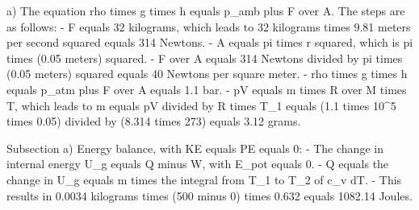 a) The equation rho times g times h equals p_amb plus F over A. The steps are as follows:
- F equals 32 kilograms, which leads to 32 kilograms times 9.81 meters per second squared equals 314 Newtons.
- A equals pi times r squared, which is pi times (0.05 meters) squared.
- F over A equals 314 Newtons divided by pi times (0.05 meters) squared equals 40 Newtons per square meter.
- rho times g times h equals p_atm plus F over A equals 1.1 bar.
- pV equals m times R over M times T, which leads to m equals pV divided by R times T_1 equals (1.1 times 10^5 times 0.05) divided by (8.314 times 273) equals 3.12 grams.

Subsection a) Energy balance, with KE equals PE equals 0:
- The change in internal energy U_g equals Q minus W, with E_pot equals 0.
- Q equals the change in U_g equals m times the integral from T_1 to T_2 of c_v dT.
- This results in 0.0034 kilograms times (500 minus 0) times 0.632 equals 1082.14 Joules.